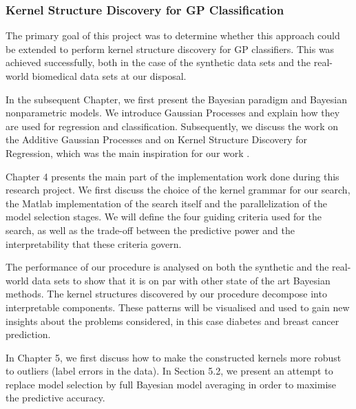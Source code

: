 \documentclass[a4paper,12pt ]{report}
\begin{document}
\subsubsection*{Kernel Structure Discovery for GP Classification}

  The primary goal of this project was to determine whether this approach could be extended to perform kernel structure discovery for GP classifiers. This was achieved successfully, both in the case of the synthetic data sets and the real-world biomedical data sets at our disposal.
  
  In the subsequent Chapter, we first present the Bayesian paradigm and Bayesian nonparametric models. We introduce Gaussian Processes and explain how they are used for regression and classification. Subsequently, we discuss the work on the Additive Gaussian Processes and on Kernel Structure Discovery for Regression, which was the main inspiration for our work \cite{duvenaud13, lloyd14}.
  
  Chapter 4 presents the main part of the implementation work done during this research project. We first discuss the choice of the kernel grammar for our search, the Matlab implementation of the search itself and the parallelization of the model selection stages. We will define the four guiding criteria used for the search, as well as the trade-off between the predictive power and the interpretability that these criteria govern.
  
   The performance of our procedure is analysed on both the synthetic and the real-world data sets to show that it is on par with other state of the art Bayesian methods. The kernel structures discovered by our procedure decompose into interpretable components. These patterns will be visualised and used to gain new insights about the problems considered, in this case diabetes and breast cancer prediction.
 
  In Chapter 5, we first discuss how to make the constructed kernels more robust to outliers (label errors in the data). In Section 5.2, we present an attempt to replace model selection by full Bayesian model averaging in order to maximise the predictive accuracy.
  
  
  
  

\end{document}
